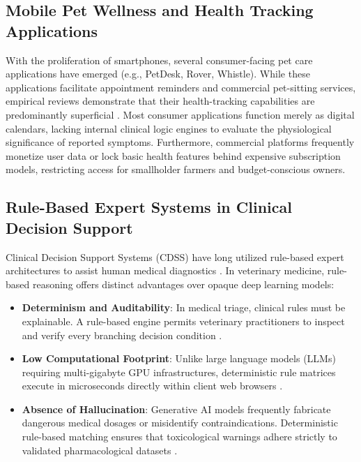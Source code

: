 \documentclass[conference]{IEEEtran}
\begin{document}
\subsection{Mobile Pet Wellness and Health Tracking Applications}
With the proliferation of smartphones, several consumer-facing pet care applications have emerged (e.g., PetDesk, Rover, Whistle). While these applications facilitate appointment reminders and commercial pet-sitting services, empirical reviews demonstrate that their health-tracking capabilities are predominantly superficial \cite{smith2021}. Most consumer applications function merely as digital calendars, lacking internal clinical logic engines to evaluate the physiological significance of reported symptoms. Furthermore, commercial platforms frequently monetize user data or lock basic health features behind expensive subscription models, restricting access for smallholder farmers and budget-conscious owners.

\subsection{Rule-Based Expert Systems in Clinical Decision Support}
Clinical Decision Support Systems (CDSS) have long utilized rule-based expert architectures to assist human medical diagnostics \cite{shortliffe2018}. In veterinary medicine, rule-based reasoning offers distinct advantages over opaque deep learning models:
\begin{itemize}
    \item \textbf{Determinism and Auditability}: In medical triage, clinical rules must be explainable. A rule-based engine permits veterinary practitioners to inspect and verify every branching decision condition \cite{cross2021}.
    \item \textbf{Low Computational Footprint}: Unlike large language models (LLMs) requiring multi-gigabyte GPU infrastructures, deterministic rule matrices execute in microseconds directly within client web browsers \cite{gupta2022}.
    \item \textbf{Absence of Hallucination}: Generative AI models frequently fabricate dangerous medical dosages or misidentify contraindications. Deterministic rule-based matching ensures that toxicological warnings adhere strictly to validated pharmacological datasets \cite{cortinovis2013}.
\end{itemize}
\end{document}
